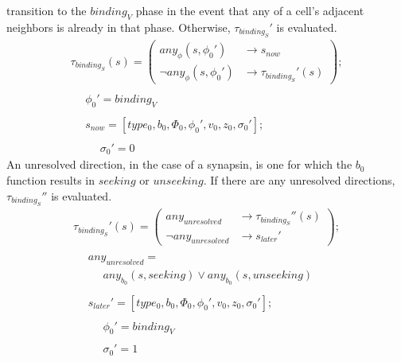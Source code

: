 \documentclass{acm_proc_article-sp}
\begin{document}
transition to the $binding_V$ phase in the event that any of a cell's
adjacent neighbors is already in that phase.  Otherwise, 
$\tau_{binding_S}'$ is evaluated.
\begin{displaymath} \begin{array}{l}
\tau_{binding_S}(s) = \left( \begin{array}{ll} any_\phi(s, \phi_0')      & \rightarrow s_{now} \\
                                               \neg any_\phi(s, \phi_0') & \rightarrow \tau_{binding_S}'(s) \end{array} \right); \\
\\
\hspace{16pt} \phi_0' = binding_V \\
\\
\hspace{16pt} s_{now} = [type_0, b_0, \Phi_0, \phi_0', v_0, z_0, \sigma_0']; \\
\\
\hspace{16pt} \hspace{16pt} \sigma_0' = 0 
\end{array} \end{displaymath}
An unresolved direction, in the case of a synapsin, is one
for which the $b_0$ function results in $seeking$ or
$unseeking$.  If there are any unresolved directions,
$\tau_{binding_S}''$ is evaluated.
\begin{displaymath} \begin{array}{l}
\tau_{binding_S}'(s) = \left( \begin{array}{ll} any_{unresolved}      & \rightarrow \tau_{binding_S}''(s) \\
                                                \neg any_{unresolved} & \rightarrow s_{later}' \end{array} \right); \\
\\
\hspace{16pt} any_{unresolved} = \\
\hspace{16pt} \hspace{16pt} any_{b_0}(s, seeking) \vee any_{b_0}(s, unseeking) \\
\\
\hspace{16pt} s_{later}' = [type_0, b_0, \Phi_0, \phi_0', v_0, z_0, \sigma_0']; \\
\\
\hspace{16pt} \hspace{16pt} \phi_0' = binding_V \\
\\
\hspace{16pt} \hspace{16pt} \sigma_0' = 1 
\end{array} \end{displaymath}
\end{document}

